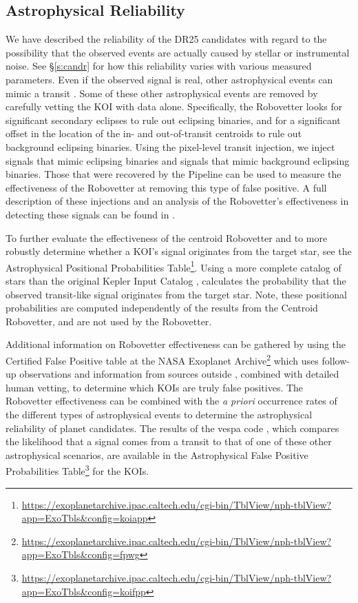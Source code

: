 \subsection{Astrophysical Reliability}
We have described the reliability of the DR25 candidates with regard to the possibility that the observed events are actually caused by stellar or instrumental noise. See \S\ref{s:candr} for how this reliability varies with various measured parameters.  Even if the observed signal is real, other astrophysical events can mimic a transit \citep[see e.g.][]{Morton2016}. Some of these other astrophysical events are removed by carefully vetting the KOI with \Kepler{} data alone.  Specifically, the Robovetter looks for significant secondary eclipses to rule out eclipsing binaries, and for a significant offset in the location of the in- and out-of-transit centroids to rule out background eclipsing binaries. Using the pixel-level transit injection, we inject signals that mimic eclipsing binaries and signals that mimic background eclipsing binaries. Those that were recovered by the \Kepler{} Pipeline can be used to measure the effectiveness of the Robovetter at removing this type of false positive. A full description of these injections and an analysis of the Robovetter's effectiveness in detecting these signals can be found in \citet{Coughlin2017a}.

To further evaluate the effectiveness of the centroid Robovetter and to more robustly determine whether a KOI's signal originates from the target star, see the Astrophysical Positional Probabilities Table\footnote{\url{https://exoplanetarchive.ipac.caltech.edu/cgi-bin/TblView/nph-tblView?app=ExoTbls&config=koiapp}}.  Using a more complete catalog of stars than the original Kepler Input Catalog \citet{Brown2011}, \citet{Bryson2017a} calculates the probability that the observed transit-like signal originates from the target star. Note, these positional probabilities are computed independently of the results from the Centroid Robovetter, and are not used by the Robovetter. 

Additional information on Robovetter effectiveness can be gathered by using the Certified False Positive table at the NASA Exoplanet Archive\footnote{\url{https://exoplanetarchive.ipac.caltech.edu/cgi-bin/TblView/nph-tblView?app=ExoTbls\&config=fpwg}} which uses follow-up observations and information from sources outside \kepler{}, combined with detailed human vetting, to determine which KOIs are truly false positives. The Robovetter effectiveness can be combined with the \emph{a priori} occurrence rates of the different types of astrophysical events to determine the astrophysical reliability of planet candidates. The results of the vespa code \citep[][]{Morton2016}, which compares the likelihood that a signal comes from a transit to that of one of these other astrophysical scenarios, are available in the Astrophysical False Positive Probabilities Table\footnote{\url{https://exoplanetarchive.ipac.caltech.edu/cgi-bin/TblView/nph-tblView?app=ExoTbls\&config=koifpp}} for the KOIs. 



